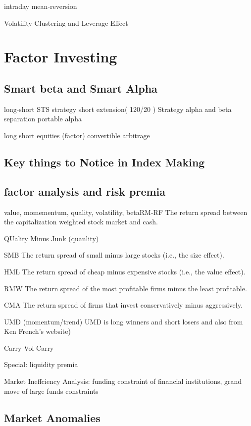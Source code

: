 \documentclass[11pt, openany]{book}              %
\begin{document}
intraday mean-reversion

Volatility Clustering and Leverage Effect 

\chapter{Factor Investing}
 
\section{Smart beta and Smart Alpha}                  %

long-short STS strategy
short extension( 120/20 ) Strategy
alpha and beta separation
portable alpha 

long short equities (factor) 
convertible arbitrage


\section{Key things to Notice in Index Making}
\section{factor analysis and risk premia}

value, momementum, quality, volatility, betaRM-RF  The return spread between the capitalization weighted stock market and cash.

QUality Minus Junk (quanlity)

SMB      The return spread of small minus large stocks (i.e., the size effect).

HML      The return spread of cheap minus expensive stocks (i.e., the value effect).

RMW     The return spread of the most profitable firms minus the least profitable.

CMA      The return spread of firms that invest conservatively minus aggressively.

UMD (momentum/trend) UMD is long winners and short losers and also from Ken French’s website)

Carry  Vol Carry


Special: liquidity premia 


Market Ineffciency Analysis: funding constraint of financial institutions, grand move of large funds constraints

\section{Market Anomalies}
\end{document}

